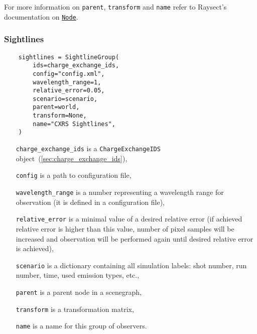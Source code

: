 \documentclass[../../main]{subfiles}
\begin{document}
For more information on \texttt{parent}, \texttt{transform} and \texttt{name} refer to Raysect's documentation on \href{https://raysect.github.io/documentation/api_reference/edge/raysect_edge_scenegraph.html?highlight=node#raysect.edge.scenegraph.node.Node}{\texttt{Node}}.

\subsubsection{Sightlines}%
\label{sec:sightlines}

\begin{verbatim}
    sightlines = SightlineGroup(
        ids=charge_exchange_ids,
        config="config.xml",
        wavelength_range=1,
        relative_error=0.05,
        scenario=scenario,
        parent=world,
        transform=None,
        name="CXRS Sightlines",
    )
\end{verbatim}

\begin{itemize}[align=left]
    \item[\texttt{charge\_exchange\_ids}] is a \texttt{ChargeExchangeIDS} object~(\cref{sec:charge_exchange_ids}),
    \item[\texttt{config}] is a path to configuration file,
    \item[\texttt{wavelength\_range}] is a number representing a wavelength range for observation (it is defined in a configuration file),
    \item[\texttt{relative\_error}] is a minimal value of a desired relative error (if achieved relative error is higher than this value, number of pixel samples will be increased and observation will be performed again until desired relative error is achieved),
    \item[\texttt{scenario}] is a dictionary containing all simulation labels: shot number, run number, time, used emission types, etc.,
    \item[\texttt{parent}] is a parent node in a scenegraph,
    \item[\texttt{transform}] is a transformation matrix,
    \item[\texttt{name}] is a name for this group of observers.
\end{itemize}
\end{document}
